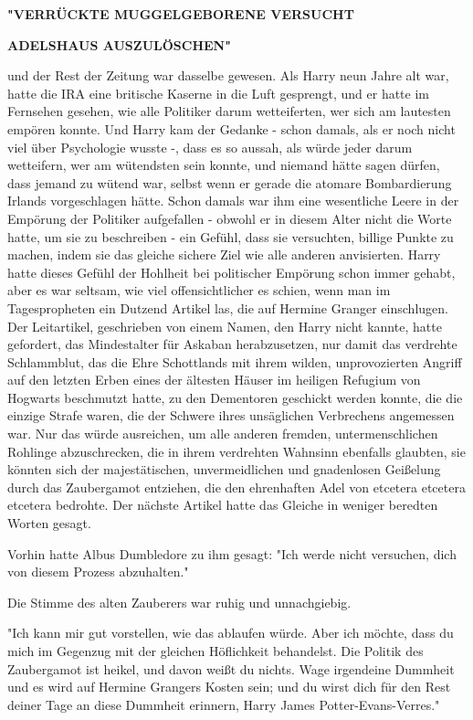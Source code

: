 {\textbf{"VERRÜCKTE MUGGELGEBORENE VERSUCHT}

\textbf{ADELSHAUS AUSZULÖSCHEN"}

und der Rest der Zeitung war dasselbe gewesen. Als Harry neun Jahre alt war, hatte die IRA eine britische Kaserne in die Luft gesprengt, und er hatte im Fernsehen gesehen, wie alle Politiker darum wetteiferten, wer sich am lautesten empören konnte. Und Harry kam der Gedanke - schon damals, als er noch nicht viel über Psychologie wusste -, dass es so aussah, als würde jeder darum wetteifern, wer am wütendsten sein konnte, und niemand hätte sagen dürfen, dass jemand zu wütend war, selbst wenn er gerade die atomare Bombardierung Irlands vorgeschlagen hätte. Schon damals war ihm eine wesentliche Leere in der Empörung der Politiker aufgefallen - obwohl er in diesem Alter nicht die Worte hatte, um sie zu beschreiben - ein Gefühl, dass sie versuchten, billige Punkte zu machen, indem sie das gleiche sichere Ziel wie alle anderen anvisierten. Harry hatte dieses Gefühl der Hohlheit bei politischer Empörung schon immer gehabt, aber es war seltsam, wie viel offensichtlicher es schien, wenn man im Tagespropheten ein Dutzend Artikel las, die auf Hermine Granger einschlugen. Der Leitartikel, geschrieben von einem Namen, den Harry nicht kannte, hatte gefordert, das Mindestalter für Askaban herabzusetzen, nur damit das verdrehte Schlammblut, das die Ehre Schottlands mit ihrem wilden, unprovozierten Angriff auf den letzten Erben eines der ältesten Häuser im heiligen Refugium von Hogwarts beschmutzt hatte, zu den Dementoren geschickt werden konnte, die die einzige Strafe waren, die der Schwere ihres unsäglichen Verbrechens angemessen war. Nur das würde ausreichen, um alle anderen fremden, untermenschlichen Rohlinge abzuschrecken, die in ihrem verdrehten Wahnsinn ebenfalls glaubten, sie könnten sich der majestätischen, unvermeidlichen und gnadenlosen Geißelung durch das Zaubergamot entziehen, die den ehrenhaften Adel von etcetera etcetera etcetera bedrohte. Der nächste Artikel hatte das Gleiche in weniger beredten Worten gesagt.

Vorhin hatte Albus Dumbledore zu ihm gesagt: "Ich werde nicht versuchen, dich von diesem Prozess abzuhalten."

Die Stimme des alten Zauberers war ruhig und unnachgiebig.

"Ich kann mir gut vorstellen, wie das ablaufen würde. Aber ich möchte, dass du mich im Gegenzug mit der gleichen Höflichkeit behandelst. Die Politik des Zaubergamot ist heikel, und davon weißt du nichts. Wage irgendeine Dummheit und es wird auf Hermine Grangers Kosten sein; und du wirst dich für den Rest deiner Tage an diese Dummheit erinnern, Harry James Potter-Evans-Verres."

}
